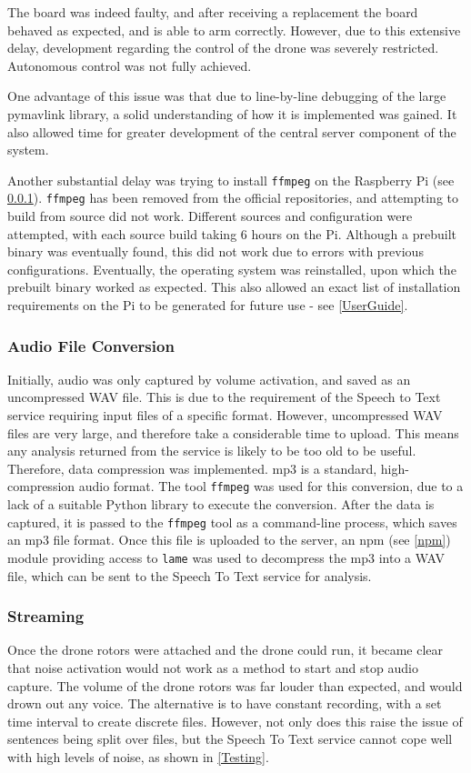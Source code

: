\documentclass{article}
\begin{document}
The board was indeed faulty, and after receiving a replacement the board behaved as expected, and is able to arm correctly. However, due to this extensive delay, development regarding the control of the drone was severely restricted. Autonomous control was not fully achieved.

One advantage of this issue was that due to line-by-line debugging of the large pymavlink library, a solid understanding of how it is implemented was gained. It also allowed time for greater development of the central server component of the system.

Another substantial delay was trying to install \texttt{ffmpeg} on the Raspberry Pi (see \ref{AudioFile}). \texttt{ffmpeg} has been removed from the official repositories, and attempting to build from source did not work. Different sources and configuration were attempted, with each source build taking 6 hours on the Pi. Although a prebuilt binary was eventually found, this did not work due to errors with previous configurations. Eventually, the operating system was reinstalled, upon which the prebuilt binary worked as expected. This also allowed an exact list of installation requirements on the Pi to be generated for future use - see \ref{UserGuide}. 

\subsubsection{Audio File Conversion}\label{AudioFile}
Initially, audio was only captured by volume activation, and saved as an uncompressed WAV file. This is due to the requirement of the Speech to Text service requiring input files of a specific format. However, uncompressed WAV files are very large, and therefore take a considerable time to upload. This means any analysis returned from the service is likely to be too old to be useful. Therefore, data compression was implemented. mp3 is a standard, high-compression audio format. The tool \texttt{ffmpeg} was used for this conversion, due to a lack of a suitable Python library to execute the conversion. After the data is captured, it is passed to the \texttt{ffmpeg} tool as a command-line process, which saves an mp3 file format. Once this file is uploaded to the server, an npm (see \ref{npm}) module\cite{npmlame} providing access to \texttt{lame} was used to decompress the mp3 into a WAV file, which can be sent to the Speech To Text service for analysis. 

\subsubsection{Streaming}\label{Streaming}
Once the drone rotors were attached and the drone could run, it became clear that noise activation would not work as a method to start and stop audio capture. The volume of the drone rotors was far louder than expected, and would drown out any voice. The alternative is to have constant recording, with a set time interval to create discrete files. However, not only does this raise the issue of sentences being split over files, but the Speech To Text service cannot cope well with high levels of noise, as shown in \ref{Testing}. 
\end{document}
